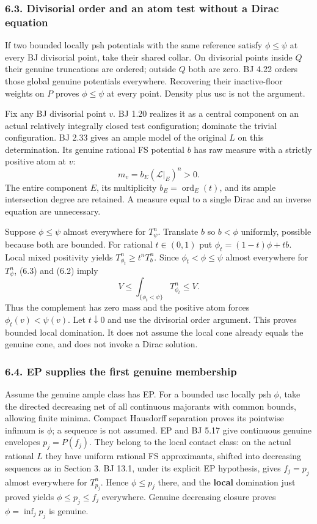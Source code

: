 \documentclass[
  10pt,
]{article}
\begin{document}
\subsubsection{6.3. Divisorial order and an atom test without a Dirac
equation}\label{divisorial-order-and-an-atom-test-without-a-dirac-equation}

If two bounded locally psh potentials with the same reference satisfy
\(\phi\le\psi\) at every BJ divisorial point, take their shared collar.
On divisorial points inside \(Q\) their genuine truncations are ordered;
outside \(Q\) both are zero. BJ 4.22 orders those global genuine
potentials everywhere. Recovering their inactive-floor weights on \(P\)
proves \(\phi\le\psi\) at every point. Density plus usc is not the
argument.

Fix any BJ divisorial point \(v\). BJ 1.20 realizes it as a central
component on an actual relatively integrally closed test configuration;
dominate the trivial configuration. BJ 2.33 gives an ample model of the
original \(L\) on this determination. Its genuine rational FS potential
\(b\) has raw measure with a strictly positive atom at \(v\):
\[m_v=b_E(\mathcal L|_E)^n>0.\] The entire component \(E\), its
multiplicity \(b_E=\operatorname{ord}_E(t)\), and its ample intersection
degree are retained. A measure equal to a single Dirac and an inverse
equation are unnecessary.

Suppose \(\phi\le\psi\) almost everywhere for \(T_\psi^n\). Translate
\(b\) so \(b<\phi\) uniformly, possible because both are bounded. For
rational \(t\in(0,1)\) put \(\phi_t=(1-t)\phi+tb\). Local mixed
positivity yields \(T_{\phi_t}^n\ge t^nT_b^n\). Since
\(\phi_t<\phi\le\psi\) almost everywhere for \(T_\psi^n\), (6.3) and
(6.2) imply \[V\le\int_{\{\phi_t<\psi\}}T_{\phi_t}^n\le V.\] Thus the
complement has zero mass and the positive atom forces
\(\phi_t(v)<\psi(v)\). Let \(t\downarrow0\) and use the divisorial order
argument. This proves bounded local domination. It does not assume the
local cone already equals the genuine cone, and does not invoke a Dirac
solution.

\subsubsection{6.4. EP supplies the first genuine
membership}\label{ep-supplies-the-first-genuine-membership}

Assume the genuine ample class has EP. For a bounded usc locally psh
\(\phi\), take the directed decreasing net of all continuous majorants
with common bounds, allowing finite minima. Compact Hausdorff separation
proves its pointwise infimum is \(\phi\); a sequence is not assumed. EP
and BJ 5.17 give continuous genuine envelopes \(p_j=P(f_j)\). They
belong to the local contact class: on the actual rational \(L\) they
have uniform rational FS approximants, shifted into decreasing sequences
as in Section 3. BJ 13.1, under its explicit EP hypothesis, gives
\(f_j=p_j\) almost everywhere for \(T_{p_j}^n\). Hence \(\phi\le p_j\)
there, and the \textbf{local} domination just proved yields
\(\phi\le p_j\le f_j\) everywhere. Genuine decreasing closure proves
\(\phi=\inf_jp_j\) is genuine.
\end{document}
